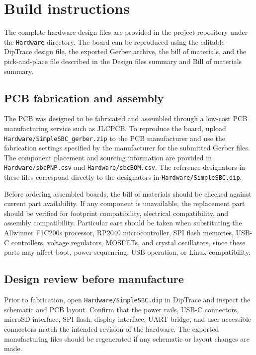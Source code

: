 \section{Build instructions}

The complete hardware design files are provided in the project repository under 
the \texttt{Hardware} directory. The board can be reproduced using the editable 
DipTrace design file, the exported Gerber archive, the bill of materials, and 
the pick-and-place file described in the Design files summary and Bill of 
materials summary.

\subsection{PCB fabrication and assembly}

The PCB was designed to be fabricated and assembled through a low-cost 
PCB manufacturing service such as JLCPCB. To reproduce the board, upload 
\texttt{Hardware/SimpleSBC_gerber.zip} to the PCB manufacturer and use the 
fabrication settings specified by the manufacturer for the submitted Gerber 
files. The component placement and sourcing information are provided in 
\texttt{Hardware/sbcPNP.csv} and \texttt{Hardware/sbcBOM.csv}. 
The reference designators in these files correspond directly to the 
designators in \texttt{Hardware/SimpleSBC.dip}.

Before ordering assembled boards, the bill of materials should be checked 
against current part availability. If any component is unavailable, the 
replacement part should be verified for footprint compatibility, electrical 
compatibility, and assembly compatibility. Particular care should be taken 
when substituting the Allwinner F1C200s processor, RP2040 microcontroller, 
SPI flash memories, USB-C controllers, voltage regulators, MOSFETs, and 
crystal oscillators, since these parts may affect boot, power sequencing, 
USB operation, or Linux compatibility.

\subsection{Design review before manufacture}

Prior to fabrication, open \texttt{Hardware/SimpleSBC.dip} in DipTrace and 
inspect the schematic and PCB layout. Confirm that the power rails, USB-C 
connectors, microSD interface, SPI flash, display interface, UART bridge, 
and user-accessible connectors match the intended revision of the hardware. 
The exported manufacturing files should be regenerated if any schematic or 
layout changes are made.

